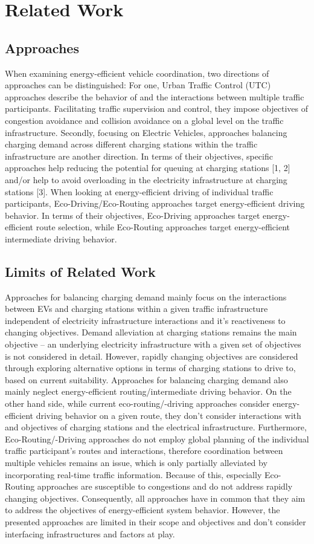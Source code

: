 \documentclass[conference]{IEEEtran}
\begin{document}
\section{Related Work}
\subsection{Approaches}
When examining energy-efficient vehicle coordination, two directions of approaches can be distinguished: For one, Urban Traffic Control (UTC) approaches describe the behavior of and the interactions between multiple traffic participants. Facilitating traffic supervision and control, they impose objectives of congestion avoidance and collision avoidance on a global level on the traffic infrastructure. Secondly, focusing on Electric Vehicles, approaches balancing charging demand across different charging stations within the traffic infrastructure are another direction. In terms of their objectives, specific approaches help reducing the potential for queuing at charging stations [1, 2] and/or help to avoid overloading in the electricity infrastructure at charging stations [3].
When looking at energy-efficient driving of individual traffic participants, Eco-Driving/Eco-Routing approaches target energy-efficient driving behavior. In terms of their objectives, Eco-Driving approaches target energy-efficient route selection, while Eco-Routing approaches target energy-efficient intermediate driving behavior.
\subsection{Limits of Related Work}
Approaches for balancing charging demand mainly focus on the interactions between EVs and charging stations within a given traffic infrastructure independent of electricity infrastructure interactions and it’s reactiveness to changing objectives. Demand alleviation at charging stations remains the main objective – an underlying electricity infrastructure with a given set of objectives is not considered in detail. However, rapidly changing objectives are considered through exploring alternative options in terms of charging stations to drive to, based on current suitability. Approaches for balancing charging demand also mainly neglect energy-efficient routing/intermediate driving behavior.
On the other hand side, while current eco-routing/-driving approaches consider energy-efficient driving behavior on a given route, they don’t consider interactions with and objectives of charging stations and the electrical infrastructure. Furthermore, Eco-Routing/-Driving approaches do not employ global planning of the individual traffic participant’s routes and interactions, therefore coordination between multiple vehicles remains an issue, which is only partially alleviated by incorporating real-time traffic information. Because of this, especially Eco-Routing approaches are susceptible to congestions and do not address rapidly changing objectives.
Consequently, all approaches have in common that they aim to address the objectives of energy-efficient system behavior. However, the presented approaches are limited in their scope and objectives and don’t consider interfacing infrastructures and factors at play.
\end{document}
